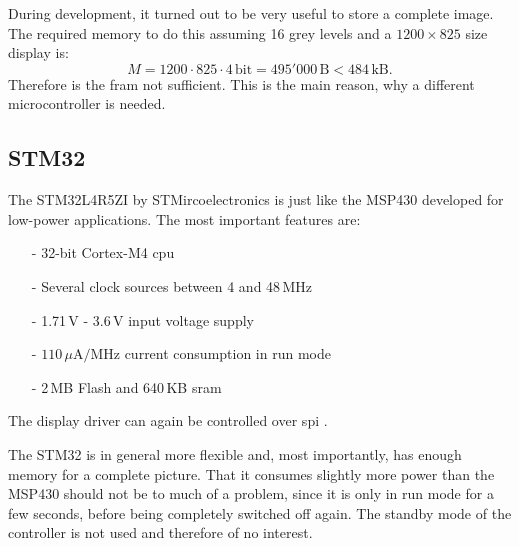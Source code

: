 During development, it turned out to be very useful to store a complete image.
The required memory to do this assuming 16 grey levels and a $1200\times 825$ size display is:
$$M = 1200\cdot 825\cdot4\,\text{bit}=495'000\,\text{B} < 484\,\text{kB}.$$
Therefore is the \acs{fram} not sufficient.
This is the main reason, why a different microcontroller is needed.

\subsection{STM32}
The STM32L4R5ZI by STMircoelectronics is just like the MSP430 developed for low-power applications.
The most important features are:
\begin{itemize}
	\item[-] 32-bit Cortex-M4 \acs{cpu}
	\item[-] Several clock sources between 4 and 48\,MHz
	\item[-] 1.71\,V - 3.6\,V input voltage supply
	\item[-] $110\,\mu \text{A}/\text{MHz}$ current consumption in run mode
	\item[-] 2\,MB Flash and 640\,KB \acs{sram}
\end{itemize}
The display driver can again be controlled over \acs{spi} \cite{stm32}.

The STM32 is in general more flexible and, most importantly, has enough memory for a complete picture.
That it consumes slightly more power than the MSP430 should not be to much of a problem, since it is only in run mode for a few seconds, before being completely switched off again.
The standby mode of the controller is not used and therefore of no interest.


